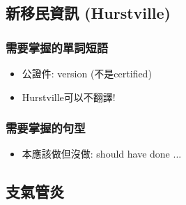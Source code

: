 \subsection{新移民資訊 (Hurstville)}
\subsubsection*{需要掌握的單詞短語}
\begin{itemize}
  \itemsep0em
  \item 公證件:  version (不是certified)
  \item Hurstville可以不翻譯!
\end{itemize}

\subsubsection*{需要掌握的句型}
\begin{itemize}
  \itemsep0em
  \item 本應該做但沒做: should have done ...
\end{itemize}

\subsection{支氣管炎}
